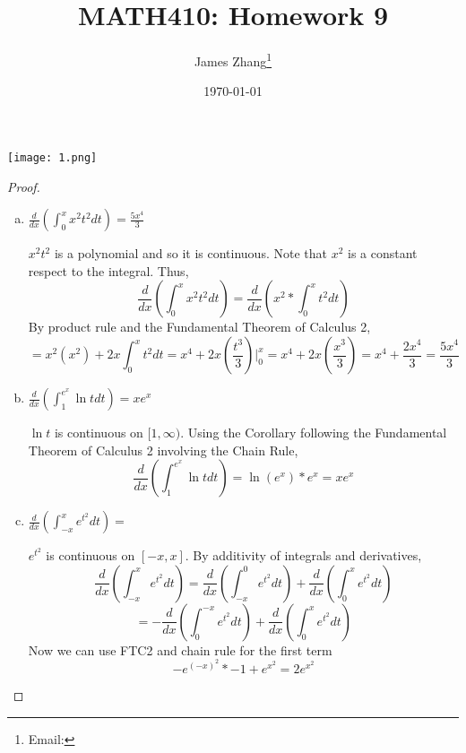 \documentclass[12pt]{scrartcl}
\begin{document}
\title{MATH410: Homework 9}
\author{James Zhang\thanks{Email: }}
\date{\today}



\maketitle

\texttt{[image: 1.png]}

\begin{proof}
  
\begin{enumerate}[a.]
  \item $\frac{d}{dx} \left( \int_0^x x^2 t^2 dt \right) = \frac{5x^4}{3}$
  
  $x^2t^2$ is a polynomial and so it is continuous. Note that $x^2$ is a constant respect to the integral. Thus,
  \[\frac{d}{dx}(\int_0^x x^2t^2 dt) = \frac{d}{dx}(x^2 * \int_0^x t^2 dt)\]
  By product rule and the Fundamental Theorem of Calculus 2, 
  \[= x^2(x^2) + 2x\int_0^x t^2 dt = x^4 + 2x\left(\frac{t^3}{3}\right)\Big|_0^x = x^4 + 2x(\frac{x^3}{3}) = x^4 + \frac{2x^4}{3} = \frac{5x^4}{3}\]
  \item $\frac{d}{dx}(\int_1^{e^x} \ln t dt) = xe^x$
  
  $\ln t$ is continuous on $[1, \infty)$. Using the Corollary following the Fundamental Theorem of Calculus 2 involving the Chain Rule, 
  \[\frac{d}{dx}(\int_1^{e^x} \ln t dt) = \ln(e^x) * e^x = xe^x\]
  \item $\frac{d}{dx}(\int_{-x}^x e^{t^2} dt) = $
  
  $e^{t^2}$ is continuous on $[-x, x]$. By additivity of integrals and derivatives, 
  \[\frac{d}{dx}(\int_{-x}^x e^{t^2} dt) = \frac{d}{dx}(\int_{-x}^0 e^{t^2} dt) + \frac{d}{dx}(\int_0^x e^{t^2} dt)\]
  \[= -\frac{d}{dx}(\int_0^{-x} e^{t^2} dt) + \frac{d}{dx}(\int_0^x e^{t^2} dt)\]
  Now we can use FTC2 and chain rule for the first term
  \[-e^{(-x)^2} * -1 + e^{x^2} = 2e^{x^2}\]
\end{enumerate}

\end{proof}
\end{document}
